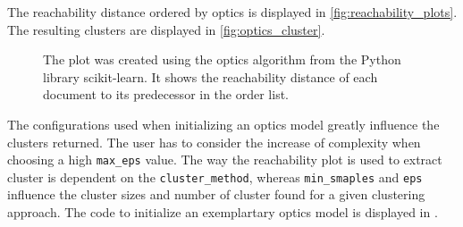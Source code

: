 The reachability distance ordered by \ac{optics} is displayed in \autoref{fig:reachability_plots}.
The resulting clusters are displayed in \autoref{fig:optics_cluster}.

\begin{figure}%
    \centering
    \qquad
    \caption{The plot was created using the \ac{optics} algorithm from the Python library scikit-learn.
    It shows the reachability distance of each document to its predecessor in the order list.}%
    \label{fig:reachability_plots}%
\end{figure}

The configurations used when initializing an \ac{optics} model greatly influence the clusters returned.
The user has to consider the increase of complexity when choosing a high \texttt{max\_eps} value.
The way the reachability plot is used to extract cluster is dependent on the \texttt{cluster\_method}, 
whereas \texttt{min\_smaples} and \texttt{eps} influence the cluster sizes and number of cluster found for a given clustering approach.
The code to initialize an exemplartary \ac{optics} model is displayed in .

